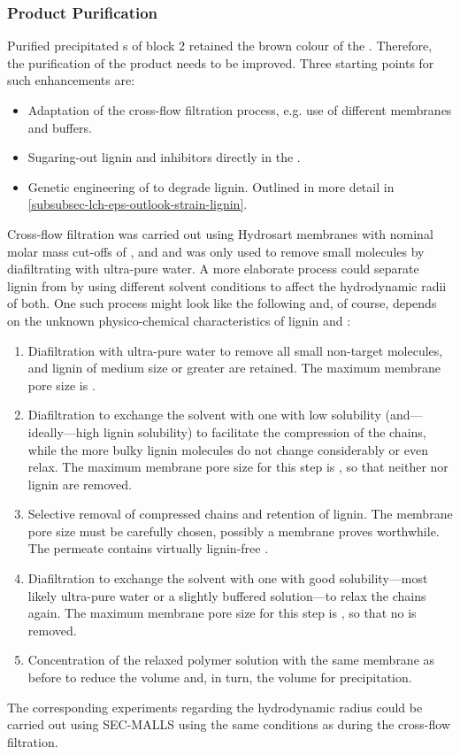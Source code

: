 \subsubsection{Product Purification\label{subsubsec-lch-eps-outlook-purification}}
Purified precipitated \eps{}s of block 2 retained the brown colour of the \lch{}. Therefore, the purification of the product needs to be improved. Three starting points for such enhancements are:
\begin{itemize}
	\item Adaptation of the cross-flow filtration process, e.g. use of different membranes and buffers.
	\item Sugaring-out lignin and inhibitors directly in the \lch{} \cite{Wang2008, PatentAppUS20090090894A1, Dhamole2010}.
	\item Genetic engineering of \strain{} to degrade lignin. Outlined in more detail in \vref{subsubsec-lch-eps-outlook-strain-lignin}.
\end{itemize}
Cross-flow filtration was carried out using Hydrosart membranes with nominal molar mass cut-offs of ,  and  and was only used to remove small molecules by diafiltrating with ultra-pure water. A more elaborate process could separate lignin from \eps{} by using different solvent conditions to affect the hydrodynamic radii of both. One such process might look like the following and, of course, depends on the unknown physico-chemical characteristics of lignin and \eps{}:
\begin{enumerate}
	\item Diafiltration with ultra-pure water to remove all small non-target molecules, \eps{} and lignin of medium size or greater are retained. The maximum membrane pore size is .
	\item Diafiltration to exchange the solvent with one with low \eps{} solubility (and---ideally---high lignin solubility) to facilitate the compression of the \eps{} chains, while the more bulky lignin molecules do not change considerably or even relax. The maximum membrane pore size for this step is , so that neither \eps{} nor lignin are removed.
	\item Selective removal of compressed \eps{} chains and retention of lignin. The membrane pore size must be carefully chosen, possibly a  membrane proves worthwhile. The permeate contains virtually lignin-free \eps{}.
	\item Diafiltration to exchange the solvent with one with good \eps{} solubility---most likely ultra-pure water or a slightly buffered solution---to relax the \eps{} chains again. The maximum membrane pore size for this step is , so that no \eps{} is removed.
	\item Concentration of the relaxed polymer solution with the same membrane as before to reduce the volume and, in turn, the volume for precipitation.
\end{enumerate}
The corresponding experiments regarding the hydrodynamic radius could be carried out using SEC-MALLS using the same conditions as during the cross-flow filtration.

